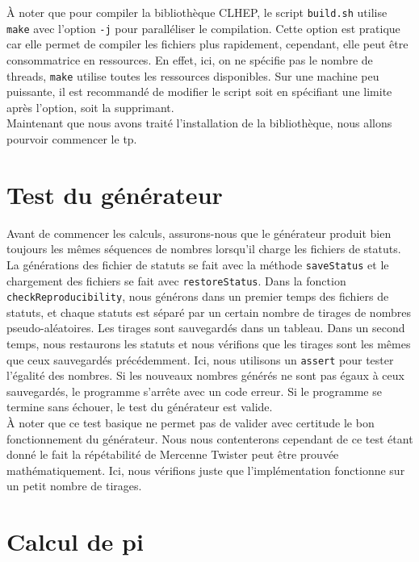 \documentclass[a4paper]{article}
\begin{document}
À noter que pour compiler la bibliothèque CLHEP, le script \texttt{build.sh}
utilise \texttt{make} avec l'option \texttt{-j} pour paralléliser le
compilation. Cette option est pratique car elle permet de compiler les fichiers
plus rapidement, cependant, elle peut être consommatrice en ressources. En
effet, ici, on ne spécifie pas le nombre de threads, \texttt{make} utilise
toutes les ressources disponibles. Sur une machine peu puissante, il est
recommandé de modifier le script soit en spécifiant une limite après l'option,
soit la supprimant.\\

Maintenant que nous avons traité l'installation de la bibliothèque, nous allons
pourvoir commencer le tp.

\section{Test du générateur}

Avant de commencer les calculs, assurons-nous que le générateur produit bien
toujours les mêmes séquences de nombres lorsqu'il charge les fichiers de
statuts.\\

La générations des fichier de statuts se fait avec la méthode
\texttt{saveStatus} et le chargement des fichiers se fait avec
\texttt{restoreStatus}. Dans la fonction \texttt{checkReproducibility}, nous
générons dans un premier temps des fichiers de statuts, et chaque statuts est
séparé par un certain nombre de tirages de nombres pseudo-aléatoires. Les
tirages sont sauvegardés dans un tableau. Dans un second temps, nous restaurons
les statuts et nous vérifions que les tirages sont les mêmes que ceux
sauvegardés précédemment. Ici, nous utilisons un \texttt{assert} pour tester
l'égalité des nombres. Si les nouveaux nombres générés ne sont pas égaux à ceux
sauvegardés, le programme s'arrête avec un code erreur. Si le programme se
termine sans échouer, le test du générateur est valide.\\

À noter que ce test basique ne permet pas de valider avec certitude le bon
fonctionnement du générateur. Nous nous contenterons cependant de ce test étant
donné le fait la répétabilité de Mercenne Twister peut être prouvée
mathématiquement. Ici, nous vérifions juste que l'implémentation fonctionne sur
un petit nombre de tirages.

\section{Calcul de pi}
\end{document}
